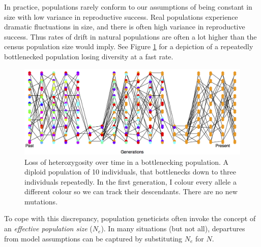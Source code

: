 In practice, populations rarely conform to our assumptions of being constant in size with low variance in reproductive success. Real populations experience dramatic fluctuations in size, and there is
often high variance in reproductive success. Thus rates of drift in
natural populations are often a lot higher than the census population
size would imply. See Figure \ref{fig:LossHet_varying_pop}  for a depiction of
a repeatedly bottlenecked population losing diversity at a fast rate.

\begin{figure}
\begin{center}
\includegraphics[width= \textwidth]{figures/Loss_of_he_col_alleles_varying_pop_dark.png}
\end{center}
\caption{Loss of heterozygosity over time in a bottlenecking population. A diploid population of 10 individuals, that bottlenecks
  down to three individuals repeatedly. In the first generation, I colour every allele a different
colour so we can track their descendants. There are no new
  mutations. } \label{fig:LossHet_varying_pop}  
\end{figure} 


To cope with this discrepancy, population geneticists often invoke the concept of
an \emph{effective population size} ($N_e$). In many situations (but not all), departures from model assumptions can be captured by substituting $N_e$ for $N$.
\\


